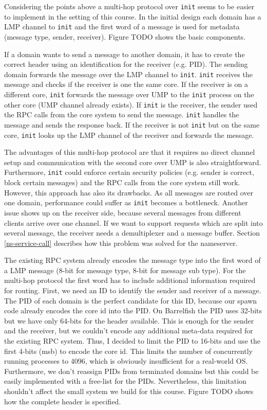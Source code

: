 Considering the points above a multi-hop protocol over \verb|init| seems to be easier
to implement in the setting of this course. In the initial design each domain has a
LMP channel to \verb|init| and the first word of a message is used for metadata (message
type, sender, receiver). Figure TODO shows the basic components. 


If a domain wants to send a message to another domain, it has to create the correct header 
using an identification for the receiver (e.g. PID). The sending domain forwards the 
message over the LMP channel to \verb|init|. \verb|init| receives the message and checks
if the receiver is one the same core. If the receiver is on a different core, \verb|init|
forwards the message over UMP to the \verb|init| process on the other core (UMP channel 
already exists). If \verb|init| is the receiver, the sender used the RPC calls from 
the core system to send the message. \verb|init| handles the message and sends the 
response back. If the receiver is not \verb|init| but on the same core, \verb|init| looks
up the LMP channel of the receiver and forwards the message.

The advantages of this multi-hop protocol are that it requires no direct channel setup and
communication with the second core over UMP is also straightforward. Furthermore, \verb|init|
could enforce certain security policies (e.g. sender is correct, block certain messages) and
the RPC calls from the core system still work. However, this approach has also its drawbacks. 
As all messages are routed over one domain, performance could suffer as \verb|init| becomes 
a bottleneck. Another issue shows up on the receiver side, because several messages from different
clients arrive over one channel. If we want to support requests which are split into several message,
the receiver needs a demultiplexer and a message buffer. Section \ref{ns-service-call} describes
how this problem was solved for the nameserver.

The existing RPC system already encodes the message type into the first word of a LMP message (8-bit for
message type, 8-bit for message sub type). For the multi-hop protocol the first word has to include additional
information required for routing. First, we need an ID to identify the sender and receiver of a message.
The PID of each domain is the perfect candidate for this ID, because our spawn code already encodes the 
core id into the PID. On Barrelfish the PID uses 32-bits but we have only 64-bits for the header available.
This is enough for the sender and the receiver, but we couldn't encode any additional meta-data required for
the existing RPC system. Thus, I decided to limit the PID to 16-bits and use the first 4-bits (msb) to encode
the core id. This limits the number of concurrently running processes to 4096, which is obviously insufficient 
for a real-world OS. Furthermore, we don't reassign PIDs from terminated domains but this could be easily 
implemented with a free-list for the PIDs. Nevertheless, this limitation shouldn't affect the small system 
we build for this course. Figure TODO shows how the complete header is specified. 


